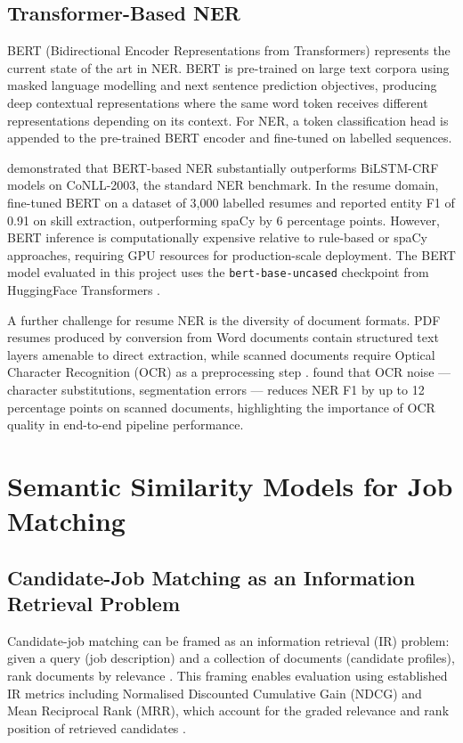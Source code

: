 \subsection{Transformer-Based NER}

BERT (Bidirectional Encoder Representations from Transformers) \citep{Devlin2019} represents the current state of the art in NER. BERT is pre-trained on large text corpora using masked language modelling and next sentence prediction objectives, producing deep contextual representations where the same word token receives different representations depending on its context. For NER, a token classification head is appended to the pre-trained BERT encoder and fine-tuned on labelled sequences.

\citet{Lample2019} demonstrated that BERT-based NER substantially outperforms BiLSTM-CRF models on CoNLL-2003, the standard NER benchmark. In the resume domain, \citet{Zhao2021} fine-tuned BERT on a dataset of 3,000 labelled resumes and reported entity F1 of 0.91 on skill extraction, outperforming spaCy by 6 percentage points. However, BERT inference is computationally expensive relative to rule-based or spaCy approaches, requiring GPU resources for production-scale deployment. The BERT model evaluated in this project uses the \texttt{bert-base-uncased} checkpoint from HuggingFace Transformers \citep{Wolf2020}.

A further challenge for resume NER is the diversity of document formats. PDF resumes produced by conversion from Word documents contain structured text layers amenable to direct extraction, while scanned documents require Optical Character Recognition (OCR) as a preprocessing step \citep{Smith2007}. \citet{Hariharan2019} found that OCR noise --- character substitutions, segmentation errors --- reduces NER F1 by up to 12 percentage points on scanned documents, highlighting the importance of OCR quality in end-to-end pipeline performance.

\section{Semantic Similarity Models for Job Matching}
\label{sec:matching}

\subsection{Candidate-Job Matching as an Information Retrieval Problem}

Candidate-job matching can be framed as an information retrieval (IR) problem: given a query (job description) and a collection of documents (candidate profiles), rank documents by relevance \citep{Manning2008}. This framing enables evaluation using established IR metrics including Normalised Discounted Cumulative Gain (NDCG) and Mean Reciprocal Rank (MRR), which account for the graded relevance and rank position of retrieved candidates \citep{Jarvelin2002}.

